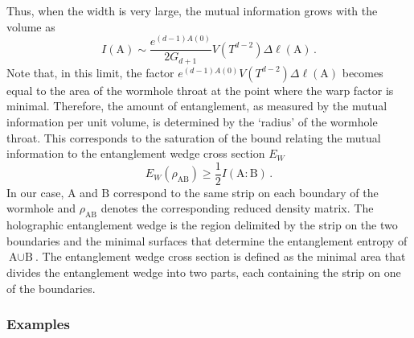 Thus, when the width is very large, the mutual information grows with the volume as
\begin{equation}\label{eq:mutualinfolarge}
	I(\text{A})\sim \frac{e^{(d-1)A(0)}}{2G_{d+1}}V(T^{d-2})\Delta \ell(\text{A})\,.
\end{equation}
Note that, in this limit, the factor $e^{(d-1)A(0)}V(T^{d-2})\Delta \ell(\text{A})$ becomes equal to the area of the wormhole throat at the point where the warp factor is minimal.
Therefore, the amount of entanglement, as measured by the mutual information per unit volume, is determined by the `radius' of the wormhole throat.
This corresponds to the saturation of the bound relating the mutual information to the entanglement wedge cross section $E_W$ \cite{Freedman:2016zud,Takayanagi:2017knl}
\begin{equation}
	E_{W}(\rho_{\text{AB}}) \geq \frac{1}{2}I(\text{A}:\text{B})\,.
\end{equation}
In our case, $\text{A}$ and $\text{B}$ correspond to the same strip on each boundary of the wormhole and $\rho_{\text{AB}}$ denotes the corresponding reduced density matrix.
The holographic entanglement wedge \cite{Czech:2012bh,Wall:2012uf,Headrick:2014cta} is the region delimited by the strip on the two boundaries and the minimal surfaces that determine the entanglement entropy of $\text{A}\cup\text{B}$.
The entanglement wedge cross section is defined as the minimal area that divides the entanglement wedge into two parts, each containing the strip on one of the boundaries.

\subsubsection{Examples}

